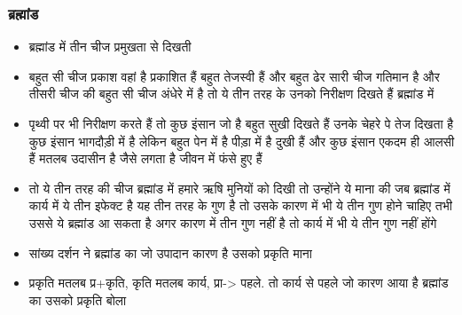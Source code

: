 \begin{frame}[fragile]\frametitle{ब्रह्मांड}

      \begin{itemize}
		\item  ब्रह्मांड में तीन चीज प्रमुखता से दिखती 
		\item बहुत सी चीज प्रकाश वहां है प्रकाशित हैं बहुत तेजस्वी हैं और बहुत ढेर सारी चीज गतिमान है और तीसरी चीज की बहुत सी चीज
अंधेरे में है तो ये तीन तरह के उनको निरीक्षण दिखते हैं ब्रह्मांड में 
		\item पृथ्वी पर भी निरीक्षण करते हैं तो कुछ इंसान जो है बहुत सुखी दिखते हैं उनके चेहरे पे तेज दिखता है कुछ इंसान भागदौड़ी में है लेकिन बहुत पेन में है पीड़ा में है दुखी हैं और कुछ इंसान एकदम ही आलसी हैं मतलब उदासीन है जैसे लगता है जीवन में फंसे हुए हैं 
		\item तो ये तीन तरह की चीज ब्रह्मांड में हमारे ऋषि मुनियों को दिखी तो उन्होंने ये माना की जब ब्रह्मांड में कार्य में ये तीन इफेक्ट है यह तीन तरह के गुण है तो उसके कारण में भी ये तीन गुण होने चाहिए तभी उससे ये ब्रह्मांड आ  सकता है अगर कारण में तीन गुण नहीं है तो कार्य
में भी ये तीन गुण नहीं होंगे 
		\item सांख्य दर्शन ने ब्रह्मांड का जो उपादान कारण है उसको प्रकृति माना
		\item प्रकृति मतलब प्र+कृति, कृति मतलब कार्य,  प्रा-> पहले. तो कार्य से पहले जो कारण आया है ब्रह्मांड का उसको प्रकृति
बोला
      \end{itemize}

\end{frame}


